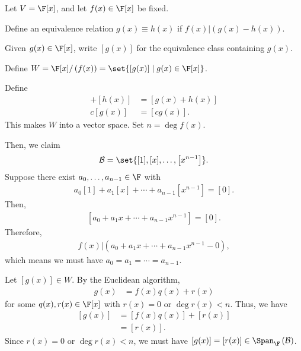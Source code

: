 \documentclass[10pt]{mypackage}
\begin{document}
\begin{example}
  Let $V = \F[x]$, and let $f(x) \in \F[x]$ be fixed.\newline

  Define an equivalence relation $g(x) \equiv h(x) $ if $f(x)|\left(g(x) - h(x)\right)$.\newline

  Given $g(x) \in \F[x]$, write $\left[g(x)\right]$ for the equivalence class containing $g(x)$.\newline

  Define $W = \F[x] / \left(f(x)\right) = \set{\left[g(x)\right]\mid g(x)\in \F[x]}$.\newline

  Define
  \begin{align*}
    [g(x)] + [h(x)] &= [g(x) + h(x)]\\
    c[g(x)] &= [cg(x)].
  \end{align*}
  This makes $W$ into a vector space. Set $n = \deg f(x)$.\newline

  Then, we claim
  \begin{align*}
    \mathcal{B} = \set{[1],[x],\dots,\left[x^{n-1}\right]}.
  \end{align*}
  Suppose there exist $a_0,\dots,a_{n-1} \in \F$ with
  \begin{align*}
    a_0 [1] + a_1[x] + \cdots + a_{n-1}\left[x^{n-1}\right] = [0].
  \end{align*}
  Then,
  \begin{align*}
    \left[a_0 + a_1x + \cdots + a_{n-1}x^{n-1}\right] = [0].
  \end{align*}
  Therefore,
  \begin{align*}
    f(x) | \left(a_0 + a_1x + \cdots + a_{n-1}x^{n-1} - 0\right),
  \end{align*}
  which means we must have $a_0 = a_1 = \cdots = a_{n-1}$.\newline

  Let $\left[g(x)\right]\in W$. By the Euclidean algorithm,
  \begin{align*}
    g(x) &= f(x)q(x) + r(x)
  \end{align*}
  for some $q(x),r(x) \in \F[x]$ with $r(x) = 0$ or $\deg r(x) < n$. Thus, we have
  \begin{align*}
    \left[g(x)\right] &= \left[f(x)q(x)\right] + \left[r(x)\right]\\
                      &= \left[r(x)\right].
  \end{align*}
  Since $r(x) = 0$ or $\deg r(x) < n$, we must have $\left[g(x)\right] = \left[r(x)\right]\in \Span_{\F}\left(\mathcal{B}\right)$.
\end{example}
\end{document}
